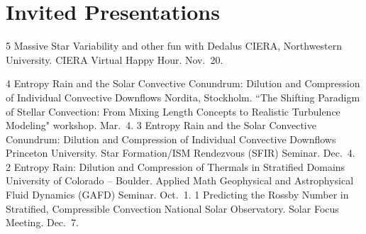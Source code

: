 \section{Invited Presentations}

	  {5}
	  {Massive Star Variability and other fun with Dedalus}
	  {
	  	CIERA, Northwestern University. CIERA Virtual Happy Hour. Nov.~20.
	  }

	  {4}
	  {Entropy Rain and the Solar Convective Conundrum: Dilution and Compression of Individual Convective Downflows}
	  {
	  	Nordita, Stockholm. ``The Shifting Paradigm of Stellar Convection: From Mixing Length Concepts to Realistic Turbulence Modeling" workshop. Mar.~4.
	  }
	  {3}
	  {Entropy Rain and the Solar Convective Conundrum: Dilution and Compression of Individual Convective Downflows}
	  {
	  	Princeton University. Star Formation/ISM Rendezvous (SFIR) Seminar. Dec.~4.
	  }
\cvpub{}
	  {2}
	  {Entropy Rain: Dilution and Compression of Thermals in Stratified Domains}
	  {
	  	University of Colorado -- Boulder. Applied Math Geophysical and Astrophysical Fluid Dynamics (GAFD) Seminar. Oct.~1.
	  }
	  {1}
	  {Predicting the Rossby Number in Stratified, Compressible Convection}
	  {
	  	National Solar Observatory. Solar Focus Meeting. Dec.~7.
	  }

